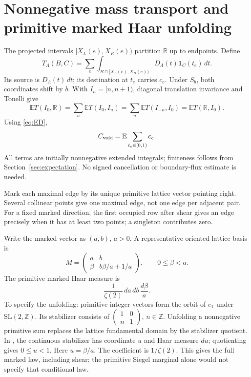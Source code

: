 \documentclass[11pt,a4paper]{article}
\newcommand{\R}{\mathbb R}\newcommand{\Z}{\mathbb Z}
\newcommand{\E}{\mathbb E}\newcommand{\Prob}{\mathbb P}
\theoremstyle{remark}\newtheorem{remark}{Remark}
\numberwithin{equation}{section}
\begin{document}
\section{Nonnegative mass transport and primitive marked Haar unfolding}\label{sec:unfold}
The projected intervals $[X_L(e),X_R(e))$ partition $\R$ up to endpoints. Define
\[
 T_\Lambda(B,C)=\sum_e\int_{B\cap[X_L(e),X_R(e))}
       D_\Lambda(t)\mathbf1_C(t_e)\,dt.
\]
Its source is $D_\Lambda(t)\,dt$; its destination at $t_e$ carries $c_e$. Under $S_b$, both coordinates shift by $b$. With $I_n=[n,n+1)$, diagonal translation invariance and Tonelli give
\[
 \E T(I_0,\R)=\sum_n\E T(I_0,I_n)
 =\sum_n\E T(I_{-n},I_0)=\E T(\R,I_0).
\]
Using \eqref{eq:ED},
\begin{equation}\label{eq:mass}
 \Cvoid=\E\sum_{t_e\in[0,1)}c_e.
\end{equation}
All terms are initially nonnegative extended integrals; finiteness follows from Section~\ref{sec:expectation}. No signed cancellation or boundary-flux estimate is needed.

Mark each maximal edge by its unique primitive lattice vector pointing right. Several collinear points give one maximal edge, not one edge per adjacent pair. For a fixed marked direction, the first occupied row after shear gives an edge precisely when it has at least two points; a singleton contributes zero.

Write the marked vector as $(a,b)$, $a>0$. A representative oriented lattice basis is
\[
 M=\begin{pmatrix}a&b\\\beta&b\beta/a+1/a\end{pmatrix},\qquad 0\le\beta<a.
\]
The primitive marked Haar measure is
\begin{equation}\label{eq:marked}
 \frac1{\zeta(2)}\,da\,db\,\frac{d\beta}{a}.
\end{equation}
To specify the unfolding: primitive integer vectors form the orbit of $e_1$ under $\mathrm{SL}(2,\Z)$. Its stabilizer consists of $\left(\begin{smallmatrix}1&0\\n&1\end{smallmatrix}\right)$, $n\in\Z$. Unfolding a nonnegative primitive sum replaces the lattice fundamental domain by the stabilizer quotient. In \cite[Section~7, Lemma~7.4 and (7.17)]{MS}, the continuous stabilizer has coordinate $u$ and Haar measure $du$; quotienting gives $0\le u<1$. Here $u=\beta/a$. The coefficient is $1/\zeta(2)$. This gives the full marked law, including shear; the primitive Siegel marginal alone would not specify that conditional law.
\end{document}
